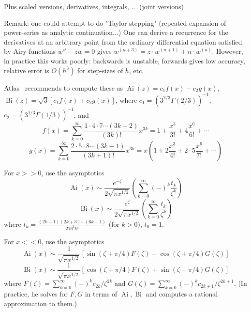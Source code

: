 \documentclass[10pt,dvipdfmx,letterpaper,twoside]{article}
\let\O=\operatorname
\newenvironment{implementation}{\noindent\begin{framed}}{\end{framed}}
\let\Gam=\Gamma
\begin{document}
Plus scaled versions, derivatives, integrals, ...
(joint versions)

Remark: one could attempt to do "Taylor stepping" (repeated expansion of power-series as analytic continuation...)
One can derive a recurrence for the derivatives at an arbitrary point from the ordinary differential equation satisfied
by Airy functions $w'' - zw = 0$ gives $w^{(n+3)} = z\cdot w^{(n+1)} + n\cdot w^{(n)}$.  However, in practice this works
poorly: backwards is unstable, forwards gives low accuracy, relative error is $O(h^3)$ for step-sizes of $h$, etc.

\begin{implementation}
Atlas~\cite{atlas:thompson} recommends to compute these as
$\O{Ai}(z) = c_1 f(x) - c_2 g(x)$, $\O{Bi}(z) = \sqrt3[c_1 f(x) + c_2 g(x)]$,
where $c_1 = (3^{2/3}\Gam(2/3))^{-1}$, $c_2 = (3^{1/3}\Gam(1/3))^{-1}$, and
\[ f(x) = \sum_{k=0}^\infty \frac{1\cdot4\cdot7\cdots(3k-2)}{(3k)!}x^{3k} = 1 + \frac{x^3}{3!} + 4\frac{x^6}{6!} + \cdots \]
\[ g(x) = \sum_{k=0}^\infty \frac{2\cdot5\cdot8\cdots(3k-1)}{(3k+1)!}x^{3k} = x(1 + 2\frac{x^3}{4!} + 2\cdot5\frac{x^6}{7!} + \cdots) \]

For $x>>0$, use the asymptotics
\[ \O{Ai}(x) \sim \frac{e^{-\zeta}}{2\sqrt{\pi x^{1/2}}}\left(\sum_{k=0}^\infty(-)^k\frac{t_k}{\zeta^k}\right) \]
\[ \O{Bi}(x) \sim \frac{e^{\zeta}}{2\sqrt{\pi x^{1/2}}}\left(\sum_{k=0}^\infty\frac{t_k}{\zeta^k}\right) \]
where $t_k = \frac{(2k+1)(2k+3)\cdots(6k-1)}{216^k k!}$ (for $k>0$), $t_0=1$.

For $x<<0$, use the asymptotics
\[ \O{Ai}(x) \sim \frac{1}{\sqrt{\pi x^{1/2}}}\left[ \sin(\zeta+\pi/4) F(\zeta) - \cos(\zeta+\pi/4) G(\zeta) \right] \]
\[ \O{Bi}(x) \sim \frac{1}{\sqrt{\pi x^{1/2}}}\left[ \cos(\zeta+\pi/4) F(\zeta) + \sin(\zeta+\pi/4) G(\zeta) \right] \]
where $F(\zeta) = \sum_{k=0}^\infty (-)^k c_{2k} / \zeta^{2k}$ and $G(\zeta) = \sum_{k=0}^\infty (-)^k c_{2k+1} / \zeta^{2k+1}$.
(In practice, he solves for $F, G$ in terms of $\O{Ai}, \O{Bi}$ and computes a rational approximation to them.)
\end{implementation}
\end{document}
